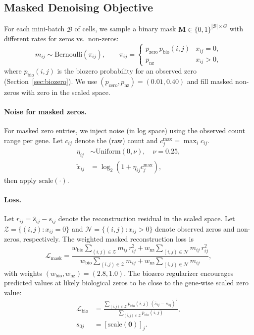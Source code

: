 \documentclass[sigconf,review]{acmart}
\theoremstyle{plain}
\theoremstyle{definition}
\theoremstyle{remark}
\begin{document}
\subsection{Masked Denoising Objective}
\label{sec:masking}
For each mini-batch $\mathcal{B}$ of cells, we sample a binary mask
$\mathbf{M}\in\{0,1\}^{|\mathcal{B}|\times G}$ with different rates for zeros
vs.\ non-zeros:
\[
m_{ij}\sim\mathrm{Bernoulli}(\pi_{ij}),\qquad
\pi_{ij}=\begin{cases}
p_{\mathrm{zero}}\,p_{\mathrm{bio}}(i,j) & x_{ij}=0,\\
p_{\mathrm{nz}} & x_{ij}>0,
\end{cases}
\]
where $p_{\mathrm{bio}}(i,j)$ is the biozero probability for an observed zero
(Section~\ref{sec:biozero}). We use $(p_{\mathrm{zero}},p_{\mathrm{nz}})=(0.01,0.40)$
and fill masked non-zeros with zero in the scaled space.

\paragraph{Noise for masked zeros.}
For masked zero entries, we inject noise (in log space) using the observed count
range per gene. Let $c_{ij}$ denote the (raw) count and
$c^{\max}_j=\max_i c_{ij}$.
\[
\begin{aligned}
\eta_{ij}&\sim\mathrm{Uniform}(0,\nu),\quad \nu=0.25,\\
\tilde{x}_{ij}&=\log_2(1+\eta_{ij}c^{\max}_j),
\end{aligned}
\]
then apply $\mathrm{scale}(\cdot)$.

\paragraph{Loss.}
Let $r_{ij}=\hat{s}_{ij}-s_{ij}$ denote the reconstruction residual in the
scaled space. Let $\mathcal{Z}=\{(i,j): x_{ij}=0\}$ and
$\mathcal{N}=\{(i,j): x_{ij}>0\}$ denote observed zeros and non-zeros,
respectively. The weighted masked reconstruction loss is
\[
\mathcal{L}_{\mathrm{mask}}=
\frac{w_{\mathrm{bio}}\sum_{(i,j)\in\mathcal{Z}} m_{ij}\,r_{ij}^2
      +w_{\mathrm{nz}}\sum_{(i,j)\in\mathcal{N}} m_{ij}\,r_{ij}^2}
     {w_{\mathrm{bio}}\sum_{(i,j)\in\mathcal{Z}} m_{ij}
      +w_{\mathrm{nz}}\sum_{(i,j)\in\mathcal{N}} m_{ij}},
\]
with weights $(w_{\mathrm{bio}},w_{\mathrm{nz}})=(2.8,1.0)$.
The biozero regularizer encourages predicted values at likely biological zeros
to be close to the gene-wise scaled zero value:
\[
\begin{aligned}
\mathcal{L}_{\mathrm{bio}}
&=\frac{\sum_{(i,j)\in\mathcal{Z}} p_{\mathrm{bio}}(i,j)\,(\hat{s}_{ij}-s_{0j})^2}
       {\sum_{(i,j)\in\mathcal{Z}} p_{\mathrm{bio}}(i,j)},\\
s_{0j}&=[\mathrm{scale}(\mathbf{0})]_j.
\end{aligned}
\]
\end{document}
